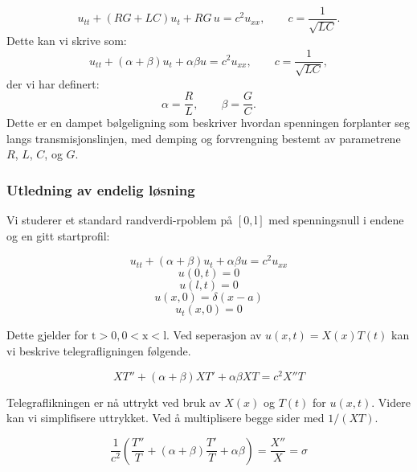 \begin{equation}
    u_{tt} + (RG + LC)u_t + RG\,u = c^2 u_{xx}, \qquad c = \frac{1}{\sqrt{LC}} .
\end{equation}
Dette kan vi skrive som:
\begin{equation}
    u_{tt} + (\alpha + \beta)u_t + \alpha \beta u = c^2 u_{xx}, \qquad c = \frac{1}{\sqrt{LC}} ,
\end{equation}
der vi har definert:
\begin{equation}
    \alpha = \frac{R}{L}, \qquad \beta = \frac{G}{C} .
\end{equation}
Dette er en dampet bølgeligning som beskriver hvordan spenningen forplanter seg langs transmisjonslinjen, med demping og forvrengning bestemt av parametrene $R$, $L$, $C$, og $G$.




\subsubsection{Utledning av endelig løsning}
Vi studerer et standard randverdi-rpoblem på $[0,\mathrm{l}]$ med spenningsnull i endene og en gitt startprofil:

\begin{equation}
    u_{tt} + (\alpha + \beta)u_t + \alpha \beta u = c^2 u_{xx}
\end{equation}
\begin{equation}
    u(0,t) = 0
\end{equation}
\begin{equation}
    u(l,t) = 0
\end{equation}
\begin{equation}
    u(x,0) = \delta(x - a)
\end{equation}
\begin{equation}
    u_t(x,0) = 0
\end{equation}

Dette gjelder for $\mathrm{t} > 0, 0 < \mathrm{x} < \mathrm{l}$. Ved seperasjon av $u(x,t)=X(x)T(t)$ kan vi beskrive telegrafligningen følgende.

\begin{equation}
    XT'' + (\alpha + \beta)XT' + \alpha \beta XT = c^2 X''T
\end{equation}

Telegraflikningen er nå uttrykt ved bruk av $X(x)$ og $T(t)$ for $u(x,t)$. Videre kan vi simplifisere uttrykket. Ved å multiplisere begge sider med $1/(XT)$.

\begin{equation}
    \frac{1}{c^2}(\frac{T''}{T} + (\alpha + \beta)\frac{T'}{T} + \alpha \beta) = \frac{X''}{X} = \sigma
\end{equation}

